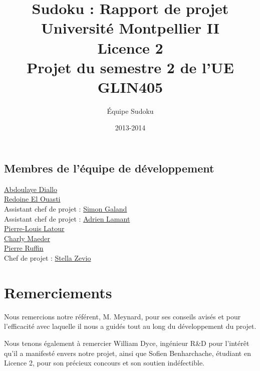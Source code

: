 \documentclass[a4paper, 12pt]{article}
\title{Sudoku : Rapport de projet\\\small{Université Montpellier II\\Licence 2\\Projet du semestre 2 de l'UE GLIN405}}
\author{Équipe Sudoku}
\date{2013-2014}
\begin{document}
\maketitle

\clearpage


	\begin{centering}

\section*{Membres de l'équipe de développement}

		\href{mailto:abdoulaye.diallo@etud.univ-montp2.fr}{Abdoulaye Diallo}\\ 			\href{mailto:redoine.el-ouasti@etud.univ-montp2.fr}{Redoine El Ouasti}\\
		Assistant chef de projet : \href{mailto:simon.galand@etud.univ-montp2.fr}{Simon Galand}\\
		Assistant chef de projet : \href{mailto:adrien.lamant@etud.univ-montp2.fr}{Adrien Lamant}\\
		\href{mailto:pierre-louis.latour@etud.univ-montp2.fr}{Pierre-Louis Latour}\\
		\href{mailto:charly.maeder@etud.univ-montp2.fr}{Charly Maeder}\\
		\href{mailto:pierre.ruffin@etud.univ-montp2.fr}{Pierre Ruffin}\\ 
		Chef de projet : \href{mailto:stella.zevio@etud.univ-montp2.fr}{Stella Zevio}\\

	\end{centering}


\clearpage


\section*{Remerciements}

	\par Nous remercions notre référent, M. Meynard, pour ses conseils avisés et pour l'efficacité avec laquelle il nous a guidés tout au long du développement du projet.
	\par Nous tenons également à remercier William Dyce, ingénieur R\&D pour l'intérêt qu'il a manifesté envers notre projet, ainsi que Sofien Benharchache, étudiant en Licence 2, pour son précieux concours et son soutien indéfectible.


\clearpage

\tableofcontents
\end{document}

